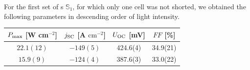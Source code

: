 \documentclass[a4paper,10pt,twocolumn]{article}
\begin{document}
\begin{extract*}
For the first set of \BHSC s $\mathbb{S}_1$, for which only one cell was not shorted, we obtained the following parameters in descending order of light intensity.
\begin{table}[h]
	\begin{tabular}{@{}cccc@{}}
		\toprule
		\multicolumn{1}{c}{$P_{\text{max}}$ [\textmu W cm$^{-2}$]} & $j_{\text{SC}}$ [\textmu A $\mathrm{cm}^{-2}$] & \multicolumn{1}{c}{$U_{\text{OC}}$ [mV]} & $FF$ [\%] \\ \midrule
		\multicolumn{1}{c}{$ 22.1(12) $}                  & $ -149(5) $                           & \multicolumn{1}{c}{424.6(4)}    & 34.9(21)  \\
		\multicolumn{1}{c}{$ 15.9(9) $}                   & $ -124(4) $                           & \multicolumn{1}{c}{387.6(3)}    & 33.0(22)  \\

\end{tabular}
\end{table}
\end{extract*}
\end{document}
